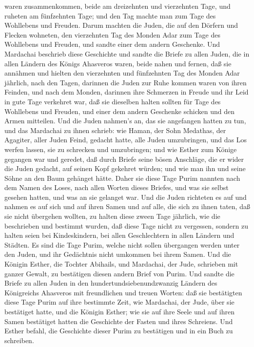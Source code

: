 waren zusammenkommen, beide am dreizehnten und vierzehnten Tage, und
ruheten am fünfzehnten Tage; und den Tag machte man zum Tage des
Wohllebens und Freuden.  Darum machten die Juden, die auf
den Dörfern und Flecken wohneten, den vierzehnten Tag des Monden Adar
zum Tage des Wohllebens und Freuden, und sandte einer dem andern
Geschenke.  Und Mardachai beschrieb diese Geschichte und
sandte die Briefe zu allen Juden, die in allen Ländern des Königs
Ahasveros waren, beide nahen und fernen,  daß sie annähmen
und hielten den vierzehnten und fünfzehnten Tag des Monden Adar
jährlich,  nach den Tagen, darinnen die Juden zur Ruhe
kommen waren von ihren Feinden, und nach dem Monden, darinnen ihre
Schmerzen in Freude und ihr Leid in gute Tage verkehret war, daß sie
dieselben halten sollten für Tage des Wohllebens und Freuden, und einer
dem andern Geschenke schicken und den Armen mitteilen.  Und
die Juden nahmen's an, das sie angefangen hatten zu tun, und das
Mardachai zu ihnen schrieb:  wie Haman, der Sohn Medathas,
der Agagiter, aller Juden Feind, gedacht hatte, alle Juden umzubringen,
und das Los werfen lassen, sie zu schrecken und umzubringen;
 und wie Esther zum Könige gegangen war und geredet, daß
durch Briefe seine bösen Anschläge, die er wider die Juden gedacht, auf
seinen Kopf gekehret würden; und wie man ihn und seine Söhne an den Baum
gehänget hätte.  Daher sie diese Tage Purim nannten nach
dem Namen des Loses, nach allen Worten dieses Briefes, und was sie
selbst gesehen hatten, und was an sie gelanget war.  Und
die Juden richteten es auf und nahmen es auf sich und auf ihren Samen
und auf alle, die sich zu ihnen taten, daß sie nicht übergehen wollten,
zu halten diese zween Tage jährlich, wie die beschrieben und bestimmt
wurden,  daß diese Tage nicht zu vergessen, sondern zu
halten seien bei Kindeskindern, bei allen Geschlechtern in allen Ländern
und Städten. Es sind die Tage Purim, welche nicht sollen übergangen
werden unter den Juden, und ihr Gedächtnis nicht umkommen bei ihrem
Samen.  Und die Königin Esther, die Tochter Abihails, und
Mardachai, der Jude, schrieben mit ganzer Gewalt, zu bestätigen diesen
andern Brief von Purim.  Und sandte die Briefe zu allen
Juden in den hundertundsiebenundzwanzig Ländern des Königreichs
Ahasveros mit freundlichen und treuen Worten:  daß sie
bestätigten diese Tage Purim auf ihre bestimmte Zeit, wie Mardachai, der
Jude, über sie bestätiget hatte, und die Königin Esther; wie sie auf
ihre Seele und auf ihren Samen bestätiget hatten die Geschichte der
Fasten und ihres Schreiens.  Und Esther befahl, die
Geschichte dieser Purim zu bestätigen und in ein Buch zu schreiben.

